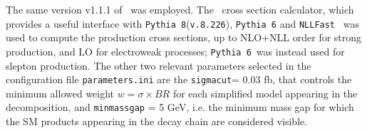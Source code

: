 \documentclass[epj,nopacs,fleqn]{svjour}
\begin{document}
The same version v1.1.1 of \SMO~was employed. The \SMO~cross section calculator, which provides a useful interface with \texttt{Pythia 8}(\texttt{v.8.226})\cite{Sjostrand:2014zea}, \texttt{Pythia 6}\cite{Sjostrand:2006za} and \texttt{NLLFast}~\cite{nllfast,Beenakker:1996ch,Kulesza:2008jb,Kulesza:2009kq,Beenakker:2009ha,Beenakker:2011fu,Beenakker:1997ut,Beenakker:2010nq} was used to compute the production cross sections, up to NLO+NLL order for strong production, and LO for electroweak processes; \texttt{Pythia 6}~was instead used for slepton production. The other two relevant parameters selected in the configuration file \texttt{parameters.ini} are the \texttt{sigmacut}= 0.03 fb, that controls the  minimum allowed weight  $w = \sigma \times BR$ for each simplified model appearing in the decomposition, and \verb|minmassgap| = 5 GeV, i.e. the minimum mass gap for which the SM products appearing in the decay chain are considered visible. 
%
\end{document}
